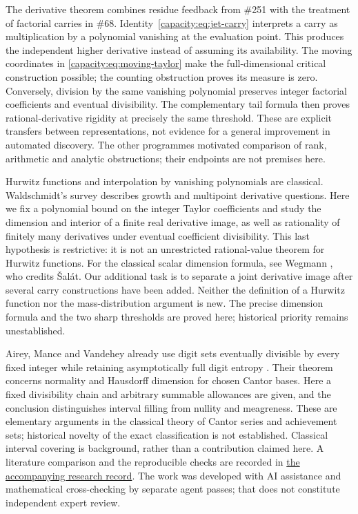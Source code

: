 \documentclass[11pt]{article}
\begin{document}
The derivative theorem combines residue feedback from \#251 with the
treatment of factorial carries in \#68. Identity~\eqref{capacity:eq:jet-carry}
interprets a carry as multiplication by a polynomial vanishing at the
evaluation point. This produces the independent higher derivative instead of
assuming its availability. The moving coordinates in
\eqref{capacity:eq:moving-taylor} make the full-dimensional critical
construction possible; the counting obstruction proves its measure is zero.
Conversely, division by the same vanishing polynomial preserves integer
factorial coefficients and eventual divisibility. The complementary tail
formula then proves rational-derivative rigidity at precisely the same
threshold. These are explicit
transfers between representations, not evidence for a general improvement in
automated discovery. The other programmes motivated comparison of rank,
arithmetic and analytic obstructions; their endpoints are not premises here.

Hurwitz functions and interpolation by vanishing polynomials are classical.
Waldschmidt's survey \cite[Sections 2--3]{waldschmidt2022} describes growth
and multipoint derivative questions. Here we fix a polynomial bound on the
integer Taylor coefficients and study the dimension and interior of a finite
real derivative image, as well as rationality of finitely many derivatives
under eventual coefficient divisibility. This last hypothesis is restrictive:
it is not an unrestricted rational-value theorem for Hurwitz functions.
For the classical scalar dimension formula, see
Wegmann \cite[Satz 4, p.~625]{wegmann1968}, who credits \v{S}al\'at.
Our additional task is to separate a joint derivative image after several
carry constructions have been added. Neither the definition of a Hurwitz
function nor the mass-distribution argument is new. The precise dimension
formula and the two sharp thresholds are proved here; historical priority
remains unestablished.

Airey, Mance and Vandehey already use digit sets eventually divisible by every
fixed integer while retaining asymptotically full digit entropy
\cite[Section 6, p.~1321]{amv2015}. Their theorem concerns normality and
Hausdorff dimension for chosen Cantor bases. Here a fixed divisibility chain and arbitrary summable allowances are given,
and the conclusion distinguishes interval filling from nullity and meagreness. These are elementary arguments in the
classical theory of Cantor series and achievement sets; historical novelty of
the exact classification is not established. Classical interval
covering is background, rather than a contribution claimed here. A literature
comparison and the reproducible checks are recorded in
\href{\repobase/research/experiments/sparse_interpolation/README.md}{the accompanying research record}.
The work was developed with AI assistance and mathematical cross-checking by
separate agent passes; that does not constitute independent expert review.
\end{document}

